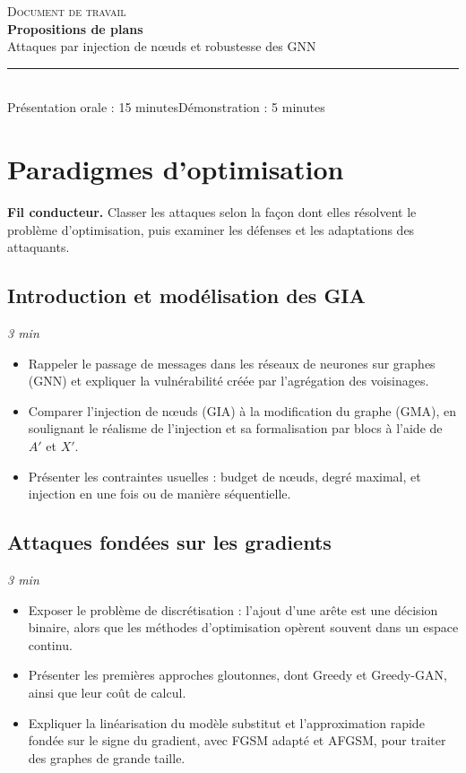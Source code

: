 \documentclass[11pt,a4paper]{article}
\newcommand{\duree}[1]{\hfill\textit{#1}}
\begin{document}
\begin{center}
    {\small\sffamily\scshape\color{secondary}Document de travail}\\[8pt]
    {\LARGE\bfseries\color{primary}Propositions de plans}\\[4pt]
    {\large Attaques par injection de nœuds et robustesse des GNN}\\[10pt]
    {\color{secondary}\rule{0.18\linewidth}{1pt}}\\[8pt]
    {\small Présentation orale : 15 minutes\quad\textbullet\quad Démonstration : 5 minutes}
\end{center}

\tableofcontents
\vspace{1em}

\section{Paradigmes d'optimisation}

\textbf{Fil conducteur.} Classer les attaques selon la façon dont elles résolvent
le problème d'optimisation, puis examiner les défenses et les adaptations des
attaquants.

\subsection{Introduction et modélisation des GIA}\duree{3 min}
\begin{itemize}
    \item Rappeler le passage de messages dans les réseaux de neurones sur graphes
    (GNN) et expliquer la vulnérabilité créée par l'agrégation des voisinages.
    \item Comparer l'injection de nœuds (GIA) à la modification du graphe (GMA),
    en soulignant le réalisme de l'injection et sa formalisation par blocs à
    l'aide de $A'$ et $X'$.
    \item Présenter les contraintes usuelles : budget de nœuds, degré maximal,
    et injection en une fois ou de manière séquentielle.
\end{itemize}

\subsection{Attaques fondées sur les gradients}\duree{3 min}
\begin{itemize}
    \item Exposer le problème de discrétisation : l'ajout d'une arête est une
    décision binaire, alors que les méthodes d'optimisation opèrent souvent
    dans un espace continu.
    \item Présenter les premières approches gloutonnes, dont Greedy et
    Greedy-GAN, ainsi que leur coût de calcul.
    \item Expliquer la linéarisation du modèle substitut et l'approximation
    rapide fondée sur le signe du gradient, avec FGSM adapté et AFGSM, pour
    traiter des graphes de grande taille.
\end{itemize}
\end{document}
